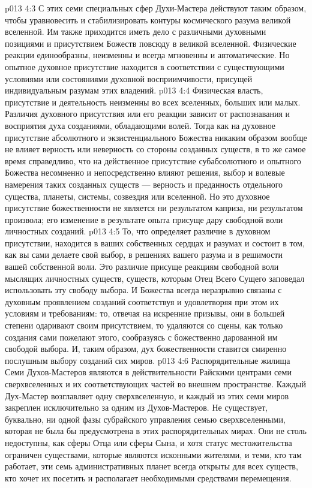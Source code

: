 \vs p013 4:3 С этих семи специальных сфер Духи\hyp{}Мастера действуют таким образом, чтобы уравновесить и стабилизировать контуры космического разума великой вселенной. Им также приходится иметь дело с различными духовными позициями и присутствием Божеств повсюду в великой вселенной. Физические реакции единообразны, неизменны и всегда мгновенны и автоматические. Но опытное духовное присутствие находится в соответствии с существующими условиями или состояниями духовной восприимчивости, присущей индивидуальным разумам этих владений.
\vs p013 4:4 \pc Физическая власть, присутствие и деятельность неизменны во всех вселенных, больших или малых. Различия духовного присутствия или его реакции зависит от распознавания и восприятия духа созданиями, обладающими волей. Тогда как на духовное присутствие абсолютного и экзистенциального Божества никаким образом вообще не влияет верность или неверность со стороны созданных существ, в то же самое время справедливо, что на действенное присутствие субабсолютного и опытного Божества несомненно и непосредственно влияют решения, выбор и волевые намерения таких созданных существ --- верность и преданность отдельного существа, планеты, системы, созвездия или вселенной. Но это духовное присутствие божественности не является ни результатом каприза, ни результатом произвола; его изменение в результате опыта присуще дару свободной воли личностных созданий.
\vs p013 4:5 То, что определяет различие в духовном присутствии, находится в ваших собственных сердцах и разумах и состоит в том, как вы сами делаете свой выбор, в решениях вашего разума и в решимости вашей собственной воли. Это различие присуще реакциям свободной воли мыслящих личностных существ, существ, которым Отец Всего Сущего заповедал использовать эту свободу выбора. И Божества всегда неразрывно связаны с духовным проявлением созданий соответствуя и удовлетворяя при этом их условиям и требованиям: то, отвечая на искренние призывы, они в большей степени одаривают своим присутствием, то удаляются со сцены, как только создания сами пожелают этого, сообразуясь с божественно дарованной им свободой выбора. И, таким образом, дух божественности ставится смиренно послушным выбору созданий сих миров.
\vs p013 4:6 \pc Распорядительные жилища Семи Духов\hyp{}Мастеров являются в действительности Райскими центрами семи сверхвселенных и их соответствующих частей во внешнем пространстве. Каждый Дух\hyp{}Мастер возглавляет одну сверхвселенную, и каждый из этих семи миров закреплен исключительно за одним из Духов\hyp{}Мастеров. Не существует, буквально, ни одной фазы субрайского управления семью сверхвселенными, которая не была бы предусмотрена в этих распорядительных мирах. Они не столь недоступны, как сферы Отца или сферы Сына, и хотя статус местожительства ограничен существами, которые являются исконными жителями, и теми, кто там работает, эти семь административных планет всегда открыты для всех существ, кто хочет их посетить и располагает необходимыми средствами перемещения.
